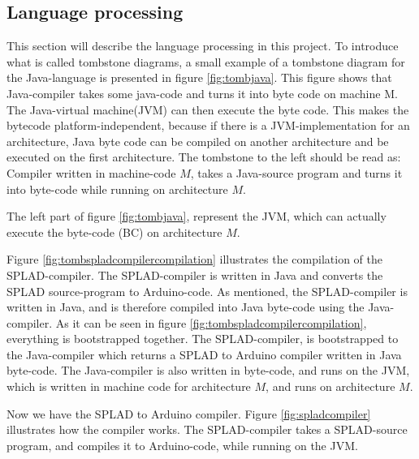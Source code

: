 \subsection{Language processing}
This section will describe the language processing in this project. To introduce what is called tombstone diagrams, a small example of a tombstone diagram for the Java-language is presented in figure \ref{fig:tombjava}. This figure shows that Java-compiler takes some java-code and turns it into byte code on machine M. The Java-virtual machine(JVM) can then execute the byte code. This makes the bytecode platform-independent, because if there is a JVM-implementation for an architecture, Java byte code can be compiled on another architecture and be executed on the first architecture. The tombstone to the left should be read as: Compiler written in machine-code $M$, takes a Java-source program and turns it into byte-code while running on architecture $M$.

The left part of figure \ref{fig:tombjava}, represent the JVM, which can actually execute the byte-code (BC) on architecture $M$.

Figure \ref{fig:tombspladcompilercompilation} illustrates the compilation of the SPLAD-compiler. The SPLAD-compiler is written in Java and converts the SPLAD source-program to Arduino-code. As mentioned, the SPLAD-compiler is written in Java, and is therefore compiled into Java byte-code using the Java-compiler. As it can be seen in figure \ref{fig:tombspladcompilercompilation}, everything is bootstrapped together. The SPLAD-compiler, is bootstrapped to the Java-compiler which returns a SPLAD to Arduino compiler written in Java byte-code. The Java-compiler is also written in byte-code, and runs on the JVM, which is written in machine code for architecture $M$, and runs on architecture $M$.

Now we have the SPLAD to Arduino compiler. Figure \ref{fig:spladcompiler} illustrates how the compiler works. The SPLAD-compiler takes a SPLAD-source program, and compiles it to Arduino-code, while running on the JVM.
